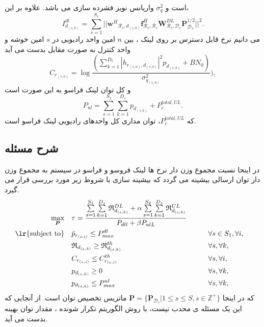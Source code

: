است و $\sigma_q^2$ واریانس نویز فشرده سازی می باشد.
علاوه بر این، 
\begin{equation}
I_{d_{(s,k)}}^{dl} =   \sum_{v=1}^{S_1} || {\boldsymbol{w}^H}_{\mathcal{R}_s, d_{(s,k)}}  \boldsymbol{f}_{\mathcal{R}_v, \mathcal{R}_s}^H  \boldsymbol{W}_{\mathcal{R}_v,\mathcal{D}_v}^{DL} \boldsymbol{P}_{\mathcal{D}_v}^{1/2}||^2.
\end{equation}
می دانیم نرخ قابل دسترس بر روی لینک ، بین $n$ امین واحد رادیویی در $s$ امین خوشه و واحد کنترل به صورت مقابل بدست می آید 
\begin{equation}
C_{r_{(s,n)}} = \log{\frac{( \sum_{k=1}^{D_t}|h_{r_{(s,n)},d_{(s,k)}}|^2{p_{d_{(s,k)}}}+ B N_0) }{ \sigma_{q_{(s,n)}}^2})},
\end{equation}
و کل توان لینک فراسو به این صورت است
\begin{equation}
P_{ul}= \sum_{s=1}^{S_2}\sum_{k=1}^{D_s}{p}_{d_{(s,k)}} + P_c^{total,UL}.
\end{equation}
که $ P_c^{total,UL}$، توان مداری کل واحدهای رادیویی لینک فراسو است.
\subsection{شرح مسئله}
 در اینحا  نسبت مجموع وزن دار نرخ ها لینک فروسو و فراسو در سیستم به مجموع وزن دار توان ارسالی بیشینه می گردد
که بیشینه سازی با شروط زیر مورد بررسی قرار می گیرد. 
\begin{equation}\label{p4}
\begin{aligned}
\max\limits_{\boldsymbol{P}}   \quad &  \tau= \frac{\sum\limits_{s=1}^{S_1} \sum\limits_{k=1}^{{D}_s}\mathfrak{R}_{d_{(s,k)}}^{DL} + \alpha \sum\limits_{s=1}^{S_2} \sum\limits_{k=1}^{{D}_s}\mathfrak{R}_{d_{(s,k)}}^{UL}} {P_{dll}+ \beta P_{ulL}}\\
\text{\lr{subject to}} \quad  & \bar{p}_{r_{(s,i)}} \leq P_{max}^{dl} && \qquad \forall s \in S_1, \forall i,   \\
&\mathfrak{R}_{d_{(s,k)}} \geq  \mathfrak{R}_{d_{(s,k)}}^{th} && \qquad \forall s, \forall k, \\
&C_{r_{(s,i)}} \leq C_{r_{(s,i)}}^{th}  &&\qquad \forall s, \forall i, \\
&p_{d_{(s,k)}}  \geq 0                                  &&\qquad \forall s, \forall k, \\
&p_{d_{(s,k)}}  \leq P_{max}^{ul}                                  &&\qquad \forall s, \forall k, \\
\end{aligned}			
\end{equation}
که در اینجا  $ \boldsymbol{P} = \{ \boldsymbol{P}_{\mathcal{D}_s}|  1 \leq s \leq S, s \in \mathbb{Z}^{+} \}$ ماتریس تخصیص توان است.
از آنجایی که این یک مسئله ی محدب نیست، با روش الگوریتم تکرار شونده ، مقدار توان بهینه بدست می آید\cite{boyd}.
